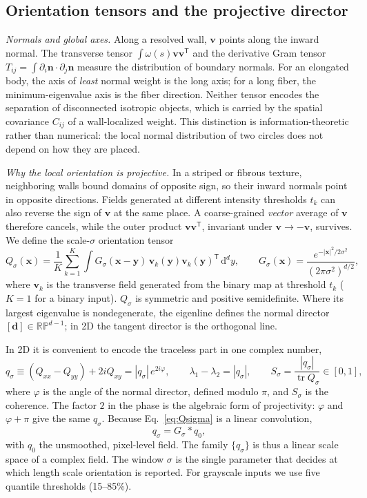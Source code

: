 \documentclass[11pt,a4paper]{article}
\newcommand{\nn}{\bm n}
\newcommand{\vv}{\bm v}
\newcommand{\dd}{\mathrm{d}}
\newcommand{\RP}{\mathbb{RP}}
\begin{document}
\subsection{Orientation tensors and the projective director}\label{subsec:orient}
\emph{Normals and global axes.} Along a resolved wall, $\vv$ points along the inward normal. The transverse tensor $\int\omega(s)\vv\vv^{\mathsf T}$ and the derivative Gram tensor $T_{ij}=\int\partial_i\nn\cdot\partial_j\nn$ measure the distribution of boundary normals. For an elongated body, the axis of \emph{least} normal weight is the long axis; for a long fiber, the minimum-eigenvalue axis is the fiber direction. Neither tensor encodes the separation of disconnected isotropic objects, which is carried by the spatial covariance $C_{ij}$ of a wall-localized weight. This distinction is information-theoretic rather than numerical: the local normal distribution of two circles does not depend on how they are placed.

\emph{Why the local orientation is projective.} In a striped or fibrous texture, neighboring walls bound domains of opposite sign, so their inward normals point in opposite directions. Fields generated at different intensity thresholds $t_k$ can also reverse the sign of $\vv$ at the same place. A coarse-grained \emph{vector} average of $\vv$ therefore cancels, while the outer product $\vv\vv^{\mathsf T}$, invariant under $\vv\to-\vv$, survives. We define the scale-$\sigma$ orientation tensor
\begin{equation}
 Q_\sigma(\bm x)=\frac1K\sum_{k=1}^{K}\int G_\sigma(\bm x-\bm y)\,\vv_k(\bm y)\vv_k(\bm y)^{\mathsf T}\,\dd^d y ,
 \qquad G_\sigma(\bm x)=\frac{e^{-|\bm x|^2/2\sigma^2}}{(2\pi\sigma^2)^{d/2}},
 \label{eq:Qsigma}
\end{equation}
where $\vv_k$ is the transverse field generated from the binary map at threshold $t_k$ ($K=1$ for a binary input). $Q_\sigma$ is symmetric and positive semidefinite. Where its largest eigenvalue is nondegenerate, the eigenline defines the normal director $[\bm d]\in\RP^{d-1}$; in 2D the tangent director is the orthogonal line.

In 2D it is convenient to encode the traceless part in one complex number,
\begin{equation}
 q_\sigma\equiv(Q_{xx}-Q_{yy})+2iQ_{xy}=|q_\sigma|\,e^{2i\varphi},\qquad
 \lambda_1-\lambda_2=|q_\sigma|,\qquad S_\sigma=\frac{|q_\sigma|}{\operatorname{tr}Q_\sigma}\in[0,1],
 \label{eq:qcomplex}
\end{equation}
where $\varphi$ is the angle of the normal director, defined modulo $\pi$, and $S_\sigma$ is the coherence. The factor $2$ in the phase is the algebraic form of projectivity: $\varphi$ and $\varphi+\pi$ give the same $q_\sigma$. Because Eq.~\eqref{eq:Qsigma} is a linear convolution,
\begin{equation}
 q_\sigma=G_\sigma*q_0 ,
 \label{eq:scalespace}
\end{equation}
with $q_0$ the unsmoothed, pixel-level field. The family $\{q_\sigma\}$ is thus a linear scale space of a complex field. The window $\sigma$ is the single parameter that decides at which length scale orientation is reported. For grayscale inputs we use five quantile thresholds (15--85\%).
\end{document}
